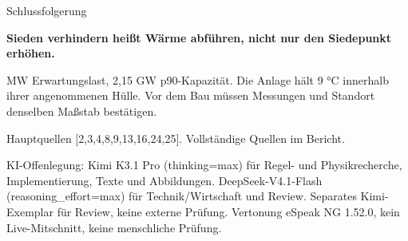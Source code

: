 \documentclass[aspectratio=169,17pt]{beamer}
\newcommand{\source}[1]{{\fontsize{10.5}{13}\selectfont\color{gray}#1\par}}
\begin{document}
\begin{frame}{Schlussfolgerung}
  \vspace{0mm}
  {\fontsize{22}{27}\selectfont\bfseries Sieden verhindern heißt Wärme abführen, nicht nur den Siedepunkt erhöhen.\par}
  \vspace{1mm}
  {\fontsize{15}{19} MW Erwartungslast, 2,15 GW p90-Kapazität. Die Anlage hält 9 °C innerhalb ihrer angenommenen Hülle. Vor dem Bau müssen Messungen und Standort denselben Maßstab bestätigen.\par}
  \vfill
  \source{Hauptquellen [2,3,4,8,9,13,16,24,25]. Vollständige Quellen im Bericht.}
  \source{KI-Offenlegung: Kimi K3.1 Pro (thinking=max) für Regel- und Physikrecherche, Implementierung, Texte und Abbildungen. DeepSeek-V4.1-Flash (reasoning\_effort=max) für Technik/Wirtschaft und Review. Separates Kimi-Exemplar für Review, keine externe Prüfung. Vertonung eSpeak NG 1.52.0, kein Live-Mitschnitt, keine menschliche Prüfung.}
\end{frame}
\end{document}
